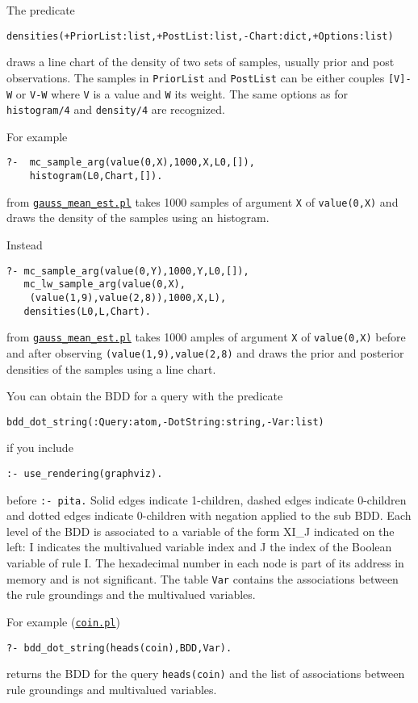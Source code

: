 The predicate
\begin{verbatim}
densities(+PriorList:list,+PostList:list,-Chart:dict,+Options:list)
\end{verbatim}
draws a line chart of the density of two sets of samples, usually
 prior and post observations. The samples in \verb|PriorList| and \verb|PostList|
can be either couples \verb|[V]-W| or \verb|V-W| where \verb|V| is a value and \verb|W| its weight.
The same options as for \verb|histogram/4| and  \verb|density/4|  are recognized.

For example
\begin{verbatim}
?-  mc_sample_arg(value(0,X),1000,X,L0,[]),
    histogram(L0,Chart,[]).
\end{verbatim}
from \href{http://cplint.eu/example/inference/gauss_mean_est.pl}{\texttt{gauss\_mean\_est.pl}}
takes 1000 samples of argument \verb|X| of \verb|value(0,X)| and draws the density of the samples using an histogram.

Instead
\begin{verbatim}
?- mc_sample_arg(value(0,Y),1000,Y,L0,[]),
   mc_lw_sample_arg(value(0,X),
    (value(1,9),value(2,8)),1000,X,L),
   densities(L0,L,Chart).
\end{verbatim}
from \href{http://cplint.eu/example/inference/gauss_mean_est.pl}{\texttt{gauss\_mean\_est.pl}}
takes 1000 amples of argument \verb|X| of \verb|value(0,X)| before and after observing
\verb|(value(1,9),value(2,8)| and draws the prior and posterior densities of the samples using a line chart.

You can obtain the BDD for a query with the predicate
\begin{verbatim}
bdd_dot_string(:Query:atom,-DotString:string,-Var:list)
\end{verbatim}
if you include
\begin{verbatim}
:- use_rendering(graphviz).
\end{verbatim}
before \verb|:- pita.|
Solid edges indicate 1-children, dashed edges indicate 0-children and dotted
edges indicate 0-children with negation applied to the sub BDD.
Each level of the BDD is associated to a variable of the form XI\_J indicated on the left:
I indicates the  multivalued variable index and J the index of the Boolean variable of rule I.
The hexadecimal number in each node is part of its address in memory and is not significant.
The table \verb|Var| contains the associations between the rule groundings and the
multivalued variables.

For example (\href{http://cplint.eu/example/inference/coin.pl}{\texttt{coin.pl}})
\begin{verbatim}
?- bdd_dot_string(heads(coin),BDD,Var).
\end{verbatim}
returns the BDD for the query \verb|heads(coin)| and the list of associations between rule groundings and
multivalued variables.

